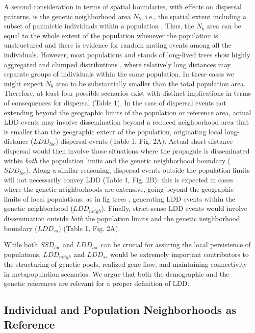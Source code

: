 \documentclass[a4paper, 12pt]{article}
\begin{document}
\begin{linenumbers}
A second consideration in terms of spatial boundaries, with effects on dispersal patterns, is the genetic neighborhood area $N_b$, i.e., the spatial extent including a subset of panmictic individuals within a population \citep{Wright:1943aa,Wright:1946aa}. Thus, the $N_b$ area can be equal to the whole extent of the population whenever the population is unstructured and there is evidence for random mating events among all the individuals. However, most populations and stands of long-lived trees show highly aggregated and clumped distributions \citep{Seidler:2006hx}, where relatively long distances may separate groups of individuals within the same population. In these cases we might expect $N_b$ area to be substantially smaller than the total population area. Therefore, at least four possible scenarios exist with distinct implications in terms of consequences for dispersal (Table 1). In the case of dispersal events not extending beyond the geographic limits of the population or reference area, actual LDD events may involve dissemination beyond a reduced neighborhood area that is smaller than the geographic extent of the population, originating local long-distance ($LDD_{loc}$) dispersal events (Table 1, Fig. 2A). Actual short-distance dispersal would then involve those situations where the propagule is disseminated within \textit{both} the population limits and the genetic neighborhood boundary ($SDD_{loc}$). Along a similar reasoning, dispersal events outside the population limits will not necessarily convey LDD (Table 1, Fig. 2B): this is expected in cases where the genetic neighborhoods are extensive, going beyond the geographic limits of local populations, as in fig trees \citep{Nason:1998aa}, generating LDD events within the genetic neighborhood ($LDD_{neigh}$). Finally, strict-sense LDD events would involve dissemination outside \textit{both} the population limits and the genetic neighborhood boundary ($LDD_{ss}$) (Table 1, Fig. 2A).

While both $SSD_{loc}$ and $LDD_{loc}$ can be crucial for assuring the local persistence of populations, $LDD_{neigh}$ and $LDD_{ss}$ would be extremely important contributors to the structuring of genetic pools, realized gene flow, and maintaining connectivity in metapopulation scenarios. We argue that both the demographic and the genetic references are relevant for a proper definition of LDD.
 


\subsection*{Individual and Population Neighborhoods as Reference}


\end{linenumbers}
\end{document}
